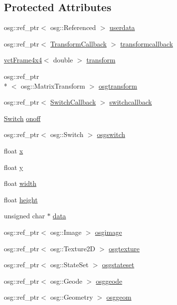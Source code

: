 \subsection*{Protected Attributes}
\begin{DoxyCompactItemize}
\item 
osg\-::ref\-\_\-ptr$<$ osg\-::\-Referenced $>$ \hyperlink{classosa_o_s_g_image_a612dc68e1eccf9b96a8d2a2976a2d2de}{userdata}
\item 
osg\-::ref\-\_\-ptr$<$ \hyperlink{classosa_o_s_g_image_1_1_transform_callback}{Transform\-Callback} $>$ \hyperlink{classosa_o_s_g_image_a0f94bfe9322fe3d40a09706398f558f4}{transformcallback}
\item 
\hyperlink{classvct_frame4x4}{vct\-Frame4x4}$<$ double $>$ \hyperlink{classosa_o_s_g_image_a995c45a06441301f3a8845bc67621b89}{transform}
\item 
osg\-::ref\-\_\-ptr\\*
$<$ osg\-::\-Matrix\-Transform $>$ \hyperlink{classosa_o_s_g_image_ad1e17d08490c1a071a136779a6cff1ab}{osgtransform}
\item 
osg\-::ref\-\_\-ptr$<$ \hyperlink{classosa_o_s_g_image_1_1_switch_callback}{Switch\-Callback} $>$ \hyperlink{classosa_o_s_g_image_a497dd33a14a175166968cb9509c87a73}{switchcallback}
\item 
\hyperlink{classosa_o_s_g_image_a2da87cd46b5af72c4a2d1b1a97122d01}{Switch} \hyperlink{classosa_o_s_g_image_afa4051f9cb78f98370739416e7411854}{onoff}
\item 
osg\-::ref\-\_\-ptr$<$ osg\-::\-Switch $>$ \hyperlink{classosa_o_s_g_image_ae0c39af6fbb02f9cecd27d9c464c43a5}{osgswitch}
\item 
float \hyperlink{classosa_o_s_g_image_a44d3e5d8face9e82282a356e4c4c3332}{x}
\item 
float \hyperlink{classosa_o_s_g_image_a6bee81116bbd53706ad648f61b74fc64}{y}
\item 
float \hyperlink{classosa_o_s_g_image_a9ba055113d2bcc4ec78db305f16fef4d}{width}
\item 
float \hyperlink{classosa_o_s_g_image_aaec6b37a20e1855336360b1825f7b4a6}{height}
\item 
unsigned char $\ast$ \hyperlink{classosa_o_s_g_image_a597695a8798c7a8cb89327da377dc679}{data}
\item 
osg\-::ref\-\_\-ptr$<$ osg\-::\-Image $>$ \hyperlink{classosa_o_s_g_image_a5ef367c2bc37b1fb525084a85ceb0142}{osgimage}
\item 
osg\-::ref\-\_\-ptr$<$ osg\-::\-Texture2\-D $>$ \hyperlink{classosa_o_s_g_image_aecdf8d95b41d0fd16155d38572394924}{osgtexture}
\item 
osg\-::ref\-\_\-ptr$<$ osg\-::\-State\-Set $>$ \hyperlink{classosa_o_s_g_image_a67af38cab8be5f535eebd267813e0958}{osgstateset}
\item 
osg\-::ref\-\_\-ptr$<$ osg\-::\-Geode $>$ \hyperlink{classosa_o_s_g_image_a972cf8e8088d4fa639c0b7f17dbc3344}{osggeode}
\item 
osg\-::ref\-\_\-ptr$<$ osg\-::\-Geometry $>$ \hyperlink{classosa_o_s_g_image_abfb175fcab2334aa3bd8c32fb49f0f23}{osggeom}
\end{DoxyCompactItemize}


